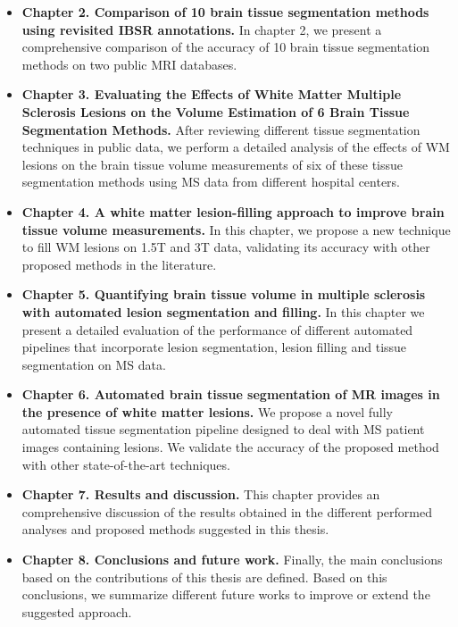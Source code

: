 \begin{itemize}
\item \textbf{Chapter 2. Comparison of 10 brain tissue segmentation methods using revisited IBSR annotations.}  In chapter 2, we present a comprehensive comparison of the accuracy of 10 brain tissue segmentation methods on two public MRI databases. 
\item \textbf{Chapter 3. Evaluating the Effects of White Matter Multiple Sclerosis Lesions on the Volume Estimation of 6 Brain Tissue Segmentation Methods.} After reviewing different tissue segmentation techniques in public data, we perform a detailed analysis of the effects of WM lesions on the brain tissue volume measurements of six of these tissue segmentation methods using MS data from different hospital centers. 
\item \textbf{Chapter 4. A white matter lesion-filling approach to improve brain tissue volume measurements.} In this chapter, we propose a new technique to fill WM lesions on 1.5T and 3T data, validating its accuracy with other proposed methods in the literature. 
\item \textbf{Chapter 5. Quantifying brain tissue volume in multiple sclerosis with automated lesion segmentation and filling.} In this chapter we present a detailed evaluation of the performance of different automated pipelines that incorporate lesion segmentation, lesion filling and tissue segmentation on MS data. 
\item \textbf{Chapter 6. Automated brain tissue segmentation of MR images in the presence of white matter lesions.} We propose a novel fully automated tissue segmentation pipeline designed to deal with MS patient images containing lesions. We validate the accuracy of the proposed method with other state-of-the-art techniques.   

\item \textbf{Chapter 7. Results and discussion.} This chapter provides an comprehensive discussion of the results obtained in the different performed analyses and proposed methods suggested in this thesis.
\item \textbf{Chapter 8. Conclusions and future work.} Finally, the main conclusions based on the contributions of this thesis are defined. Based on this conclusions, we  summarize different future works to improve or extend the suggested approach.   
\end{itemize}

